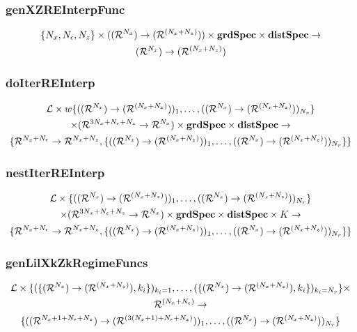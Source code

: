 \documentclass[tikz]{beamer}
\begin{document}
\begin{frame}
\frametitle{genXZREInterpFunc}
\label{sec:genfpfunc}
\begin{gather*}
\{\numX,\numEps,\numZ\}\times(\xzFuncGuessSig)\times \grdSpec \times  \dstSpec   \rightarrow\\
\bigXFuncSig
\end{gather*}



\end{frame}

\begin{frame}
\frametitle{doIterREInterp}
\label{sec:doiterreinterp}

\begin{gather*}
  \linMod \times 
w\{(\xzFuncGuessSig)_1,\ldots,(\xzFuncGuessSig)_{\numR}\}  \\
 \times (\eqnFuncSig ) \times \grdSpec \times \dstSpec \rightarrow\\
\{\frfpnsFuncSig, \{(\xzFuncGuessSig)_1,\ldots,(\xzFuncGuessSig)_{\numR}\}\}
\end{gather*}



\end{frame}



\begin{frame}
\frametitle{nestIterREInterp}
\label{sec:nestiterreinterp}



\begin{gather*}
  \linMod \times 
\{(\xzFuncGuessSig)_1,\ldots,(\xzFuncGuessSig)_{\numR}\}  \\
 \times (\eqnFuncSig ) \times \grdSpec \times \dstSpec \times \numIters \rightarrow\\
\{\frfpnsFuncSig, \{(\xzFuncGuessSig)_1,\ldots,(\xzFuncGuessSig)_{\numR}\}\}
\end{gather*}



\end{frame}


\begin{frame}
\frametitle{genLilXkZkRegimeFuncs}
\label{sec:genlilxkzkregimefunc}
{\small
\begin{gather*}
\linMod \times \{(\{  \bigXFuncSig, k_i \})_{k_i=1},\ldots,(\{  \bigXFuncSig, k_i \})_{k_i=\numR}\} \times\\ \Rn{(\numX+\numEps)} \rightarrow\\
\{(\lilXRegimeFuncSig)_1,\ldots,(\xzFuncGuessSig)_{\numR}\}
\end{gather*}
}





\end{frame}
\end{document}
